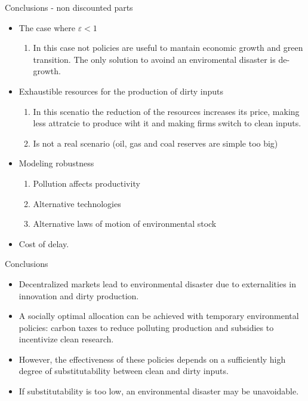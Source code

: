 \documentclass[aspectratio=169,xcolor=dvipsnames]{beamer}
\begin{document}
\begin{frame}{Conclusions - non discounted parts}
    \begin{itemize}
        \item The case where $\varepsilon < 1$
        \begin{enumerate}
            \item In this case not policies are useful to mantain economic growth and green transition. The only solution to avoind an enviromental disaster is de-growth.
        \end{enumerate}
        \item Exhaustible resources for the production of dirty inputs
        \begin{enumerate}
            \item In this scenatio the reduction of the resources increases its price, making less attratcie to produce wiht it and making firms switch to clean inputs. 
            \item Is not a real scenario (oil, gas and coal reserves are simple too big)
        \end{enumerate}
        \item Modeling robustness 
        \begin{enumerate}
            \item Pollution affects productivity
            \item Alternative technologies 
            \item Alternative laws of motion of environmental stock
        \end{enumerate}
        \item Cost of delay.
    \end{itemize}
\end{frame}

\begin{frame}{Conclusions}
    \begin{itemize}
        \item Decentralized markets lead to environmental disaster due to externalities in innovation and dirty production.
        \item A socially optimal allocation can be achieved with temporary environmental policies: carbon taxes to reduce polluting production and subsidies to incentivize clean research.
        \item However, the effectiveness of these policies depends on a sufficiently high degree of substitutability between clean and dirty inputs.
        \item If substitutability is too low, an environmental disaster may be unavoidable.
    \end{itemize}
\end{frame}
\end{document}
